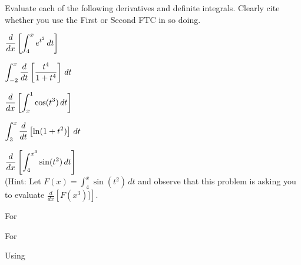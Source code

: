 \begin{activity} \label{A:5.2.3}  
Evaluate each of the following derivatives and definite integrals.  Clearly cite whether you use the First or Second FTC in so doing.
\ba
	\item $\displaystyle \frac{d}{dx} \left[ \int_4^x e^{t^2} \, dt \right]$
	\item $\displaystyle \int_{-2}^x \frac{d}{dt} \left[ \frac{t^4}{1+t^4} \right] \, dt$
	\item $\displaystyle \frac{d}{dx} \left[ \int_{x}^1 \cos(t^3) \, dt \right]$
	\item $\displaystyle \int_{3}^x \frac{d}{dt} \left[ \ln(1+t^2) \right] \, dt$
	\item $\displaystyle \frac{d}{dx} \left[ \int_4^{x^3} \sin(t^2) \, dt \right]$ \\ (Hint: Let $F(x) = \int_4^x \sin(t^2) \, dt$ and observe that this problem is asking you to evaluate $\frac{d}{dx} \left[F(x^3)] \right]$.
\ea
\end{activity}
\begin{smallhint}
\ba
	\item For 
\ea
\end{smallhint}
\begin{bighint}
\ba
	\item For 
\ea
\end{bighint}
\begin{activitySolution}
\ba
	\item Using 
\ea
\end{activitySolution}
\aftera